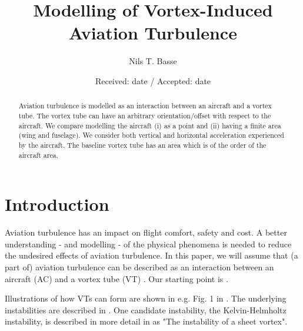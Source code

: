 \documentclass[smallextended]{svjour3}       %
\begin{document}
\title{Modelling of Vortex-Induced Aviation Turbulence}


\author{Nils T. Basse}



\date{Received: date / Accepted: date}


\maketitle

\begin{abstract}
Aviation turbulence is modelled as an interaction between an aircraft and a vortex tube. The vortex tube can have an arbitrary orientation/offset with respect to the aircraft. We compare modelling the aircraft (i) as a point and (ii) having a finite area (wing and fuselage). We consider both vertical and horizontal acceleration experienced by the aircraft. The baseline vortex tube has an area which is of the order of the aircraft area.
\end{abstract}

\section{Introduction}

Aviation turbulence \citep{sharman_a} has an impact on flight comfort, safety and cost. A better understanding - and modelling - of the physical phenomena is needed to reduce the undesired effects of aviation turbulence. In this paper, we will assume that (a part of) aviation turbulence can be described as an interaction between an aircraft (AC) and a vortex tube (VT) \citep{lamb_a,saffman_a}. Our starting point is \citep{lunnon_a}.

Illustrations of how VTs can form are shown in e.g. Fig. 1 in \citep{wingrove_a}. The underlying instabilities are described in \citep{lin_a}. One candidate instability, the Kelvin-Helmholtz instability, is described in more detail in \citep{batchelor_a} as "The instability of a sheet vortex".
\end{document}
